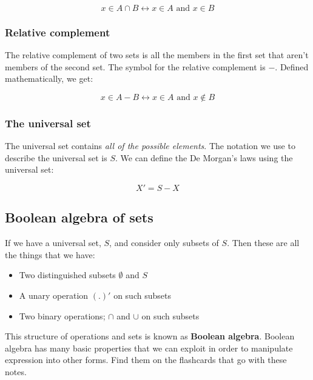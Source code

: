 \begin{dmath}
	{x \in A \cap B \leftrightarrow x \in A \textrm{ and } x \in B}
\end{dmath}

\subsubsection{Relative complement}

The relative complement of two sets is all the members in the first set that
aren't members of the second set. The symbol for the relative complement is $-$.
Defined mathematically, we get:

\begin{dmath}
	{x \in A - B} \leftrightarrow {x \in A \textrm{ and } x \notin B}
\end{dmath}

\subsubsection{The universal set}
\label{subsubsec:universal_set}

The universal set contains {\it all of the possible elements}. The notation we
use to describe the universal set is $S$. We can define the De Morgan's laws
using the universal set:

\begin{dmath}
	X' = S - X
\end{dmath}

\subsection{Boolean algebra of sets}

If we have a universal set, $S$, and consider only subsets of $S$. Then these
are all the things that we have:

\begin{itemize}
	\item Two distinguished subsets $\emptyset$ and $S$
	\item A unary operation $(.)'$ on such subsets
	\item Two binary operations; $\cap$ and $\cup$ on such subsets
\end{itemize}

This structure of operations and sets is known as {\bf Boolean algebra}. Boolean
algebra has many basic properties that we can exploit in order to manipulate
expression into other forms. Find them on the flashcards that go with these
notes.

